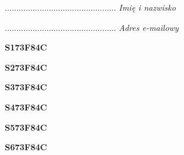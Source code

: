\begin{turn}{90}\begin{minipage}{\linewidth} \vspace{20mm} ................................................  \textit{Imię i nazwisko}\end{minipage}\end{turn}

\begin{turn}{90}\begin{minipage}{\linewidth} \vspace{20mm} ................................................  \textit{Adres e-mailowy}\end{minipage}\end{turn}

\begin{turn}{90}\huge \begin{minipage}{\linewidth} \vspace{10mm}\textbf{S173F84C}\end{minipage}\end{turn}

\begin{turn}{90}\huge \begin{minipage}{\linewidth} \vspace{10mm}\textbf{S273F84C}\end{minipage}\end{turn}

\begin{turn}{90}\huge \begin{minipage}{\linewidth} \vspace{10mm}\textbf{S373F84C}\end{minipage}\end{turn}

\begin{turn}{90}\huge \begin{minipage}{\linewidth} \vspace{10mm}\textbf{S473F84C}\end{minipage}\end{turn}

\begin{turn}{90}\huge \begin{minipage}{\linewidth} \vspace{10mm}\textbf{S573F84C}\end{minipage}\end{turn}

\begin{turn}{90}\huge \begin{minipage}{\linewidth} \vspace{10mm}\textbf{S673F84C}\end{minipage}\end{turn}

